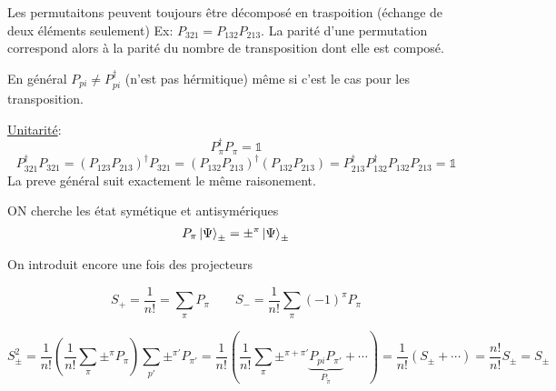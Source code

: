 Les permutaitons peuvent toujours être décomposé en traspoition (échange de deux éléments seulement) Ex: $P_{321} = P_{132} P_{213} $. La parité d'une permutation correspond alors à la parité du nombre de transposition dont elle est composé.



En général $P_{pi} \neq P_{pi}^\dagger$ (n'est pas hérmitique) même si c'est le cas pour les transposition. 

\underline{Unitarité}: $$P_{\pi}^\dagger P_{\pi} = \mathds{1}$$ $$P_{321}^\dagger P_{321} = (P_{123} P_{213})^\dagger P_{321} = (P_{132} P_213)^\dagger (P_{132} P_{213} ) = P_{213}^\dagger P_{132}^\dagger P_{132} P_{213} = \mathds{1}$$  
La preve général suit exactement le même raisonement.


ON cherche les état symétique et antisymériques
$$P_{\pi} \ket{\Psi}_\pm = \pm^\pi \ket{\Psi}_\pm$$ 


On introduit encore une fois des projecteurs

$$S_{+} = \frac{1}{n!} = \sum_{\pi} P_{\pi} \qquad S_{-} = \frac{1}{n!} \sum_{\pi} (-1)^\pi P_{\pi} $$ 


$$S_{\pm}^2 = \frac{1}{n!} \left( \frac{1}{n!} \sum_{\pi} \pm^\pi P_{\pi}  \right) \sum_{p'} \pm^{\pi'} P_{\pi'} = \frac{1}{n!} \left( \frac{1}{n!} \sum_{\pi} \pm^{\pi+\pi'} \underbrace{P_{pi} P_{\pi'}}_{P_{\tilde \pi}} + \dotsb \right) = \frac{1}{n!} (S_{\pm} + \dotsb) = \frac{n!}{n!} S_{\pm} = S_{\pm}  $$ 


	

